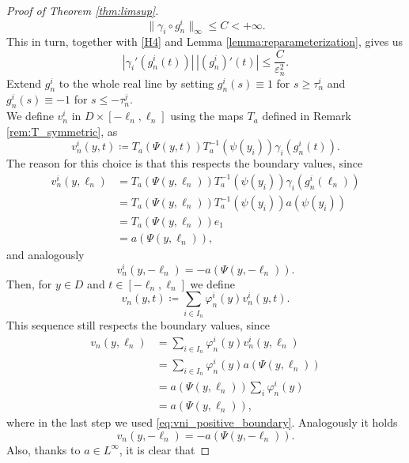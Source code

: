 \documentclass[a4paper, 11pt, reqno]{amsart}
\theoremstyle{plain}
\theoremstyle{definition}
\theoremstyle{remark}
\begin{document}
\begin{proof}[Proof of Theorem \ref{thm:limsup}]
\begin{equation}
    \| \gamma_i \circ g_n^i \|_\infty \leq C < + \infty.
\end{equation}
This in turn, together with \ref{H4} and Lemma \ref{lemma:reparameterization}, gives us
\begin{equation}\label{eq:limsup_geodesics_1overepssquared}
    | \gamma_i'(g_n^i(t)) | \, |(g_n^i)'(t) | \leq \frac{C}{\varepsilon_n^2}.
\end{equation}
Extend $g_n^i$ to the whole real line by setting $g_n^i(s) \equiv 1$ for $s \geq \tau_n^i$ and $g_n^i(s) \equiv -1$ for $s \leq -\tau_n^j$.\\
We define $v_n^i$ in $ D \times [-\ell_n, \ell_n] $ using the maps $T_a$ defined in Remark \ref{rem:T_symmetric}, as
\begin{equation}
    v_n^i(y,t) \coloneqq T_a (\Psi(y,t)) T_a^{-1} (\psi(y_i)) \gamma_i(g_n^i(t)).
\end{equation}
The reason for this choice is that this respects the boundary values, since 
\begin{align}\label{eq:vni_positive_boundary}
    v_n^i(y,\ell_n) &= T_a (\Psi(y,\ell_n)) T_a^{-1} (\psi(y_i)) \gamma_i(g_n^i(\ell_n)) \nonumber\\
    &= T_a (\Psi(y,\ell_n)) T_a^{-1} (\psi(y_i)) a ( \psi (y_i)) \nonumber\\
    &= T_a (\Psi(y,\ell_n)) e_1 \nonumber\\
    &= a(\Psi(y, \ell_n)),
\end{align}
and analogously 
\begin{equation}\label{eq:vni_negative_boundary}
    v_n^i(y, -\ell_n) = -a(\Psi(y,-\ell_n)).
\end{equation} Then, for $y \in D$ and $t \in [-\ell_n, \ell_n]$ we define
\begin{equation}
    v_n(y,t) \coloneqq \sum_{i \in I_n} \varphi_n^i(y) v_n^i (y,t).
\end{equation}
This sequence still respects the boundary values, since
\begin{align*}
    v_n (y, \ell_n) &= \sum_{i \in I_n} \varphi_n^i(y) v_n^i (y,\ell_n) \\
    &= \sum_{i \in I_n} \varphi_n^i(y) a (\Psi(y, \ell_n)) \\
    &= a (\Psi(y, \ell_n)) \sum_i \varphi_n^i(y) \\
    &= a (\Psi(y, \ell_n)),
\end{align*}
where in the last step we used \eqref{eq:vni_positive_boundary}. Analogously it holds
$$ v_n (y, - \ell_n) = - a (\Psi(y, -\ell_n)).$$
Also, thanks to $a \in L^\infty$, it is clear that 

\end{proof}
\end{document}
